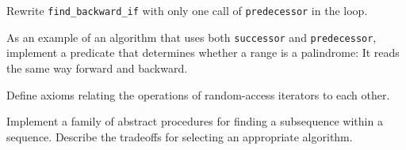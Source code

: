 \begin{exercise}
	Rewrite \verb|find_backward_if| with only one call of \verb|predecessor| in the loop.
\end{exercise}



\begin{exercise}
	As an example of an algorithm that uses both \verb|successor| and \verb|predecessor|,
	implement a predicate that determines whether a range is a palindrome: It reads the
	same way forward and backward.
\end{exercise}



\begin{project}
	Define axioms relating the operations of random-access iterators to each other.
\end{project}

\begin{project}
	Implement a family of abstract procedures for finding a subsequence within a
	sequence. Describe the tradeoffs for selecting an appropriate algorithm.
\end{project}
